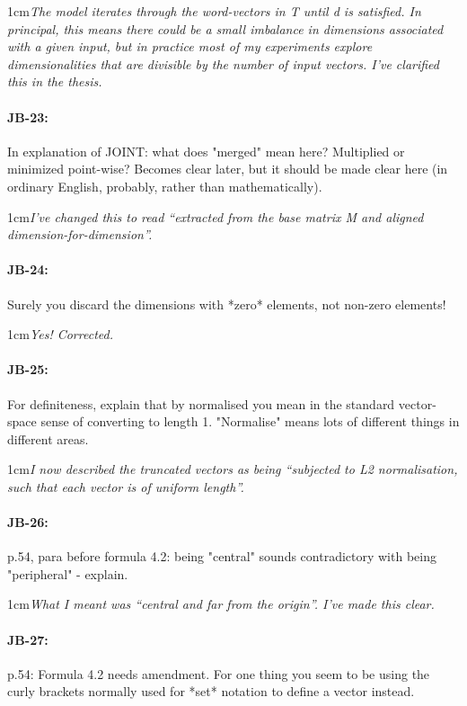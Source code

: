 \documentclass[11pt,a4paper]{article}
\newcommand{\res}[1]{\vspace{0.25cm} \begin{adjustwidth}{1cm}{}\emph{#1}\end{adjustwidth}}
\begin{document}
\res{The model iterates through the word-vectors in T until d is satisfied.  In principal, this means there could be a small imbalance in dimensions associated with a given input, but in practice most of my experiments explore dimensionalities that are divisible by the number of input vectors.  I've clarified this in the thesis.}

\paragraph{JB-23:} In explanation of JOINT: what does "merged" mean here? Multiplied or minimized point-wise? Becomes clear later, but it should be made clear here (in ordinary English, probably, rather than mathematically).

\res{I've changed this to read ``extracted from the base matrix M and aligned dimension-for-dimension''.}

\paragraph{JB-24:} Surely you discard the dimensions with *zero* elements, not non-zero elements!

\res{Yes!  Corrected.}

\paragraph{JB-25:} For definiteness, explain that by normalised you mean in the standard vector-space sense of converting to length 1. "Normalise" means lots of different things in different areas.

\res{I now described the truncated vectors as being ``subjected to L2 normalisation, such that each vector is of uniform length''.}

\paragraph{JB-26:} p.54, para before formula 4.2: being "central" sounds contradictory with being "peripheral" - explain.

\res{What I meant was ``central and far from the origin''.  I've made this clear.}

\paragraph{JB-27:} p.54: Formula 4.2 needs amendment. For one thing you seem to be using the curly brackets normally used for *set* notation to define a vector instead.
\end{document}
